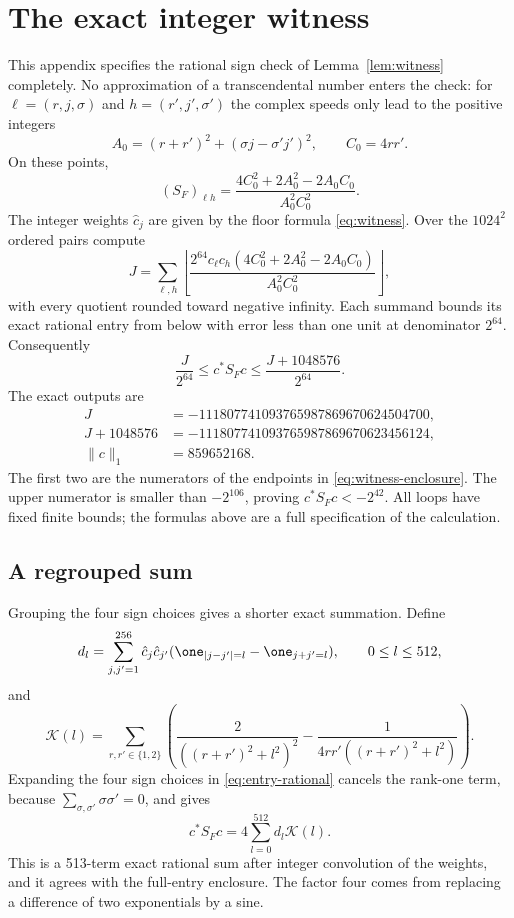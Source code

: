 \section{The exact integer witness}\label{app:witness}
This appendix specifies the rational sign check of
Lemma~\ref{lem:witness} completely. No approximation of a transcendental
number enters the check: for $\ell=(r,j,\sigma)$ and $h=(r',j',\sigma')$
the complex speeds only lead to the positive integers
\[
 A_0=(r+r')^2+(\sigma j-\sigma'j')^2,\qquad C_0=4rr'.
\]
On these points,
\begin{equation}\label{eq:entry-rational}
 (S_F)_{\ell h}
       =\frac{4C_0^2+2A_0^2-2A_0C_0}{A_0^2C_0^2}.
\end{equation}
The integer weights $\hat c_j$ are given by the floor formula \eqref{eq:witness}.
Over the $1024^2$ ordered pairs compute
\begin{equation}\label{eq:integer-enclosure}
 J=\sum_{\ell,h}\left\lfloor\frac{2^{64}c_\ell c_h(4C_0^2+2A_0^2-2A_0C_0)}
 {A_0^2C_0^2}\right\rfloor,
\end{equation}
with every quotient rounded toward negative infinity. Each summand
bounds its exact rational entry from below with error less than one
unit at denominator $2^{64}$. Consequently
\[
 \frac{J}{2^{64}}\le c^*S_Fc\le\frac{J+1048576}{2^{64}}.
\]
The exact outputs are
\begin{align*}
 J&=-111807741093765987869670624504700,\\
 J+1048576&=-111807741093765987869670623456124,\\
 \|c\|_1&=859652168.
\end{align*}
The first two are the numerators of the endpoints in \eqref{eq:witness-enclosure}.
The upper numerator is
smaller than $-2^{106}$, proving $c^*S_Fc<-2^{42}$. All loops have fixed
finite bounds; the formulas above are a full specification of the
calculation.

\subsection{A regrouped sum}
Grouping the four sign choices gives a shorter exact summation. Define
\[
 d_l=\sum_{j,j'=1}^{256}\hat c_j\hat c_{j'}
       (\one_{|j-j'|=l}-\one_{j+j'=l}),\qquad0\le l\le512,
\]
and
\[
 \mathcal K(l)=\sum_{r,r'\in\{1,2\}}
 \left(\frac2{((r+r')^2+l^2)^2}
       -\frac1{4rr'((r+r')^2+l^2)}\right).
\]
Expanding the four sign choices in \eqref{eq:entry-rational} cancels the
rank-one term, because $\sum_{\sigma,\sigma'}\sigma\sigma'=0$, and gives
\begin{equation}\label{eq:witness-convolution}
                        c^*S_Fc=4\sum_{l=0}^{512}d_l\mathcal K(l).
\end{equation}
This is a 513-term exact rational sum after integer convolution of the
weights, and it agrees with the full-entry enclosure. The factor four
comes from replacing a difference of two exponentials by a sine.

